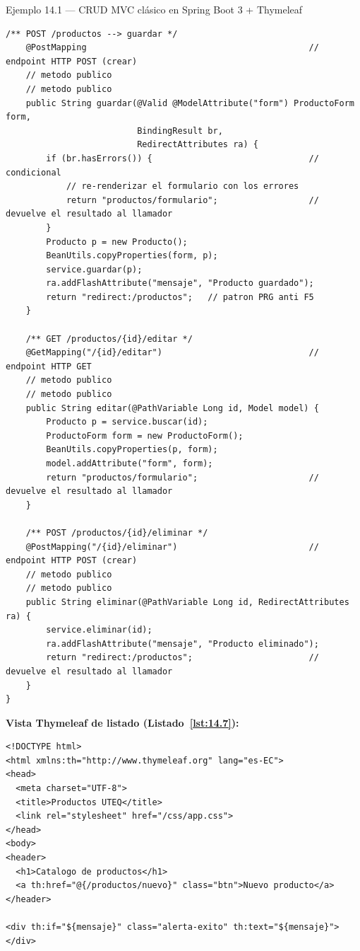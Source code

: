 \documentclass[11pt,a4paper,openany]{book}
\begin{document}
\begin{cajaejemplo}{Ejemplo 14.1 --- CRUD MVC clásico en Spring Boot 3 + Thymeleaf}
\begin{lstlisting}[style=java,caption={ProductoController.java},label=lst:14.6]
    /** POST /productos --> guardar */
    @PostMapping                                            // endpoint HTTP POST (crear)
    // metodo publico
    // metodo publico
    public String guardar(@Valid @ModelAttribute("form") ProductoForm form,
                          BindingResult br,
                          RedirectAttributes ra) {
        if (br.hasErrors()) {                               // condicional
            // re-renderizar el formulario con los errores
            return "productos/formulario";                  // devuelve el resultado al llamador
        }
        Producto p = new Producto();
        BeanUtils.copyProperties(form, p);
        service.guardar(p);
        ra.addFlashAttribute("mensaje", "Producto guardado");
        return "redirect:/productos";   // patron PRG anti F5
    }

    /** GET /productos/{id}/editar */
    @GetMapping("/{id}/editar")                             // endpoint HTTP GET
    // metodo publico
    // metodo publico
    public String editar(@PathVariable Long id, Model model) {
        Producto p = service.buscar(id);
        ProductoForm form = new ProductoForm();
        BeanUtils.copyProperties(p, form);
        model.addAttribute("form", form);
        return "productos/formulario";                      // devuelve el resultado al llamador
    }

    /** POST /productos/{id}/eliminar */
    @PostMapping("/{id}/eliminar")                          // endpoint HTTP POST (crear)
    // metodo publico
    // metodo publico
    public String eliminar(@PathVariable Long id, RedirectAttributes ra) {
        service.eliminar(id);
        ra.addFlashAttribute("mensaje", "Producto eliminado");
        return "redirect:/productos";                       // devuelve el resultado al llamador
    }
}
\end{lstlisting}

\textbf{Vista Thymeleaf de listado (Listado~\ref{lst:14.7}):}
\begin{lstlisting}[style=html,caption={templates/productos/lista.html},label=lst:14.7]
<!DOCTYPE html>
<html xmlns:th="http://www.thymeleaf.org" lang="es-EC">
<head>
  <meta charset="UTF-8">
  <title>Productos UTEQ</title>
  <link rel="stylesheet" href="/css/app.css">
</head>
<body>
<header>
  <h1>Catalogo de productos</h1>
  <a th:href="@{/productos/nuevo}" class="btn">Nuevo producto</a>
</header>

<div th:if="${mensaje}" class="alerta-exito" th:text="${mensaje}"></div>


\end{lstlisting}
\end{cajaejemplo}
\end{document}
